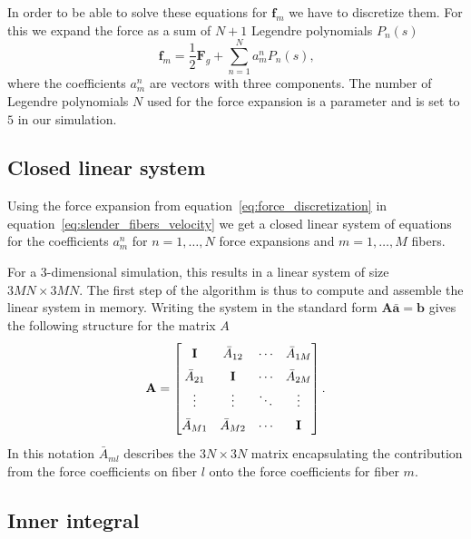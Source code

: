\documentclass[a4paper,11pt]{kth-mag}
\begin{document}
In order to be able to solve these equations for $\mathbf{f}_m$ we have to discretize them. For this we expand the force as a sum of $N+1$ Legendre polynomials $P_n(s)$
\begin{equation}
  \label{eq:force_discretization}
  \mathbf{f}_m = \frac{1}{2}\mathbf{F}_g + \sum_{n=1}^{N}a_{m}^{n} P_n(s) \text{,}
\end{equation}
where the coefficients $a_{m}^{n}$ are vectors with three components. The number of Legendre polynomials $N$ used for the force expansion is a parameter and is set to $5$ in our simulation.

\subsection{Closed linear system}

Using the force expansion from equation~\ref{eq:force_discretization} in equation~\ref{eq:slender_fibers_velocity} we get a closed linear system of equations for the coefficients $a_{m}^{n}$ for $n=1,\dots,N$ force expansions and $m = 1,\dots,M$ fibers.

For a 3-dimensional simulation, this results in a linear system of size $3MN\times3MN$. The first step of the algorithm is thus to compute and assemble the linear system in memory. Writing the system in the standard form $\mathbf{A}\mathbf{\bar{a}}=\mathbf{b}$ gives the following structure for the matrix $A$
\begin{equation}
  \label{eq:matrix_structure}
  \renewcommand\arraystretch{1.5}
  \mathbf{A} =
  \begin{bmatrix}
    \mathbf{I} & \bar{A}_{12} & \cdots & \bar{A}_{1M} \\
    \bar{A}_{21} & \mathbf{I} & \cdots & \bar{A}_{2M} \\
    \vdots & \vdots & \ddots & \vdots \\
    \bar{A}_{M1} & \bar{A}_{M2} & \cdots & \mathbf{I}
  \end{bmatrix} \text{.}
\end{equation}
In this notation $\bar{A}_{ml}$ describes the $3N\times3N$ matrix encapsulating the contribution from the force coefficients on fiber $l$ onto the force coefficients for fiber $m$.

\subsection{Inner integral}
\label{subsec:inner_integral}
\end{document}
